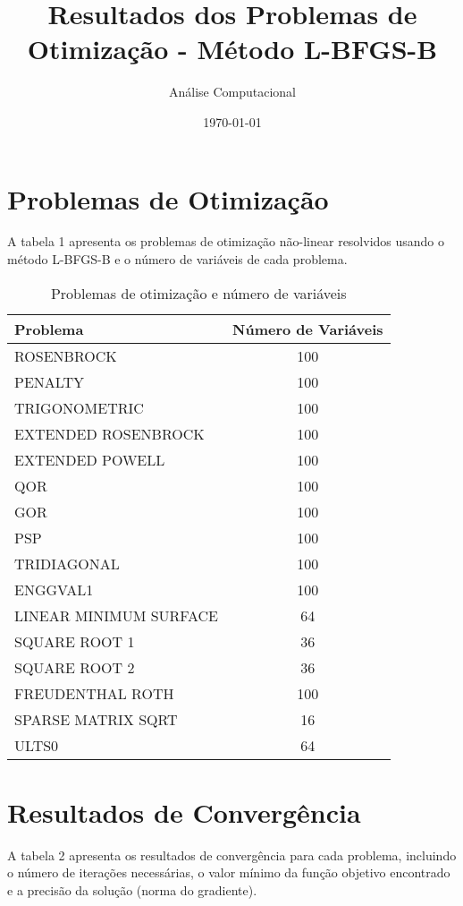 \documentclass[12pt]{article}
\title{Resultados dos Problemas de Otimização - Método L-BFGS-B}
\author{Análise Computacional}
\date{\today}
\begin{document}
\maketitle

\section{Problemas de Otimização}

A tabela 1 apresenta os problemas de otimização não-linear resolvidos usando o método L-BFGS-B e o número de variáveis de cada problema.

\begin{table}[h!]
\centering
\caption{Problemas de otimização e número de variáveis}
\label{tab:problemas_variáveis}
\begin{tabular}{@{}|lc|@{}}
\toprule
\textbf{Problema} & \textbf{Número de Variáveis} \\
\midrule
ROSENBROCK & 100 \\
PENALTY & 100 \\
TRIGONOMETRIC & 100 \\
EXTENDED ROSENBROCK & 100 \\
EXTENDED POWELL & 100 \\
QOR & 100 \\
GOR & 100 \\
PSP & 100 \\
TRIDIAGONAL & 100 \\
ENGGVAL1 & 100 \\
LINEAR MINIMUM SURFACE & 64 \\
SQUARE ROOT 1 & 36 \\
SQUARE ROOT 2 & 36 \\
FREUDENTHAL ROTH & 100 \\
SPARSE MATRIX SQRT & 16 \\
ULTS0 & 64 \\
\bottomrule
\end{tabular}
\end{table}

\section{Resultados de Convergência}

A tabela 2 apresenta os resultados de convergência para cada problema, incluindo o número de iterações necessárias, o valor mínimo da função objetivo encontrado e a precisão da solução (norma do gradiente).
\end{document}
